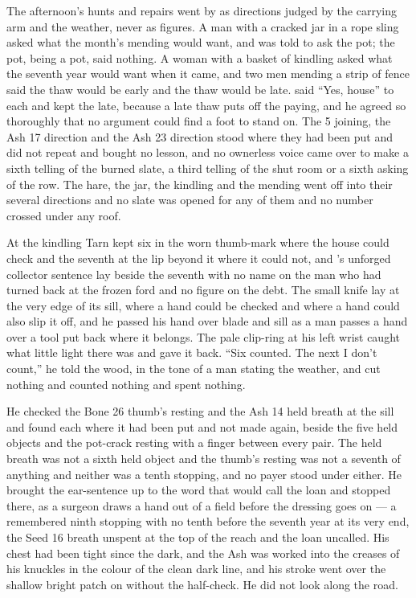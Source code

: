 \scenebreak

The afternoon's hunts and repairs went by as directions judged by the carrying arm and the weather, never as figures. A man with a cracked jar in a rope sling asked what the month's mending would want, and was told to ask the pot; the pot, being a pot, said nothing. A woman with a basket of kindling asked what the seventh year would want when it came, and two men mending a strip of fence said the thaw would be early and the thaw would be late.  said “Yes, house” to each and kept the late, because a late thaw puts off the paying, and he agreed so thoroughly that no argument could find a foot to stand on. The  5 joining, the Ash 17 direction and the Ash 23 direction stood where they had been put and did not repeat and bought no lesson, and no ownerless voice came over  to make a sixth telling of the burned slate, a third telling of the shut room or a sixth asking of the row. The hare, the jar, the kindling and the mending went off into their several directions and no slate was opened for any of them and no number crossed under any roof.

At the kindling Tarn kept six in the worn thumb-mark where the house could check and the seventh at the lip beyond it where it could not, and 's unforged collector sentence lay beside the seventh with no name on the man who had turned back at the frozen ford and no figure on the debt. The small knife lay at the very edge of its sill, where a hand could be checked and where a hand could also slip it off, and he passed his hand over blade and sill as a man passes a hand over a tool put back where it belongs. The pale clip-ring at his left wrist caught what little light there was and gave it back. “Six counted. The next I don't count,” he told the wood, in the tone of a man stating the weather, and cut nothing and counted nothing and spent nothing.

He checked the Bone 26 thumb's resting and the Ash 14 held breath at the sill and found each where it had been put and not made again, beside the five held objects and the pot-crack resting with a finger between every pair. The held breath was not a sixth held object and the thumb's resting was not a seventh of anything and neither was a tenth stopping, and no payer stood under either. He brought the ear-sentence up to the word that would call the loan and stopped there, as a surgeon draws a hand out of a field before the dressing goes on — a remembered ninth stopping with no tenth before the seventh year at its very end, the Seed 16 breath unspent at the top of the reach and the loan uncalled. His chest had been tight since the dark, and the Ash was worked into the creases of his knuckles in the colour of the clean dark line, and his stroke went over the shallow bright patch on  without the half-check. He did not look along the road.

